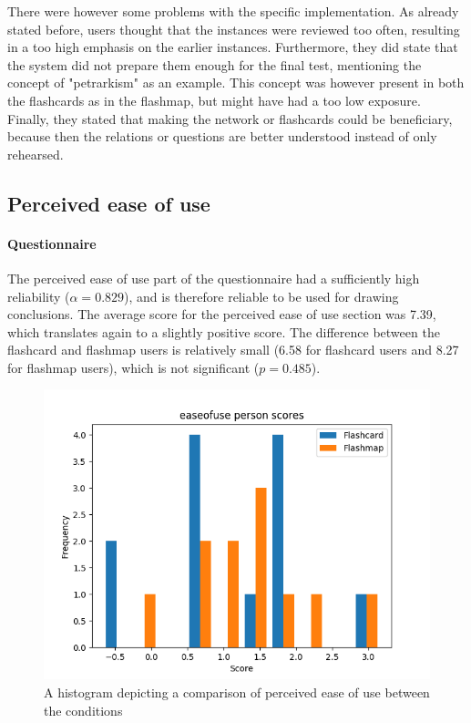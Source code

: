 There were however some problems with the specific implementation. As already stated before, users thought that the instances were reviewed too often, resulting in a too high emphasis on the earlier instances. Furthermore, they did state that the system did not prepare them enough for the final test, mentioning the concept of "petrarkism" as an example. This concept was however present in both the flashcards as in the flashmap, but might have had a too low exposure. Finally, they stated that making the network or flashcards could be beneficiary, because then the relations or questions are better understood instead of only rehearsed.

\subsection{Perceived ease of use}

\paragraph{Questionnaire} The perceived ease of use part of the questionnaire had a sufficiently high reliability ($\alpha=0.829$), and is therefore reliable to be used for drawing conclusions. The average score for the perceived ease of use section was 7.39, which translates again to a slightly positive score. The difference between the flashcard and flashmap users is relatively small (6.58 for flashcard users and 8.27 for flashmap users), which is not significant ($p=0.485$).

\begin{figure}
    \centering
    \includegraphics[width=.7\textwidth]{img/easeofuse_abil.png}
    \caption{A histogram depicting a comparison of perceived ease of use between the conditions}
    \label{fig:easeofuse_abil}
\end{figure}

